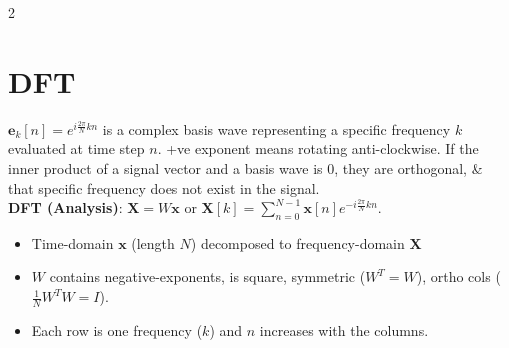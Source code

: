 \documentclass[10pt]{article}
\begin{document}
\begin{multicols*}{2}
\section*{DFT}
$\mathbf{e}_k[n] = e^{i\frac{2\pi}{N}kn}$ is a complex basis wave representing a specific frequency $k$ evaluated at time step $n$. +ve exponent means rotating anti-clockwise.
If the inner product of a signal vector and a basis wave is $0$, they are orthogonal, \& that specific frequency does not exist in the signal.\\
\textbf{DFT (Analysis)}: $\mathbf{X} = W\mathbf{x}$  or  $\mathbf{X}[k] = \sum_{n=0}^{N-1} \mathbf{x}[n]e^{-i\frac{2\pi}{N}kn}$.
\begin{itemize}
    \item Time-domain $\mathbf{x}$ (length $N$) decomposed to frequency-domain $\mathbf{X}$
    \item $W$ contains negative-exponents, is square, symmetric ($W^T = W$), ortho cols ($\frac{1}{N}W^TW = I$).
    \item Each row is one frequency ($k$) and $n$ increases with the columns.
\end{itemize}




\end{multicols*}
\end{document}
